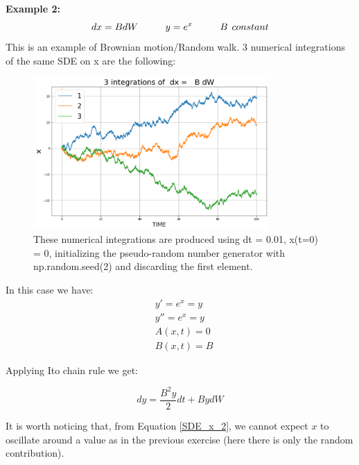\textbf{Example 2:} 
\begin{equation}
    dx = BdW \hspace{10mm} y = e^x \hspace{10mm} B\hspace{1.5mm}constant
    \label{SDE_x_2}
\end{equation}
This is an example of Brownian motion/Random walk. 
3 numerical integrations of the same SDE on x are the following:
\begin{figure}[H]
  \centering
  \includegraphics[width=0.8\textwidth]{SDE/Figures/SDEx_2.png}
  \caption{These numerical integrations are produced using dt = 0.01, x(t=0) = 0, initializing the pseudo-random number generator with np.random.seed(2) and discarding the first element.} 
  \label{Fig:SDE_x_2}
\end{figure}

In this case we have:
 \begin{equation}
     \begin{split}
         & y' = e^x = y \\
         & y'' = e^x = y \\
         & A(x, t) = 0 \\
         & B(x, t) = B
     \end{split}
 \end{equation}

Applying Ito chain rule we get: 
  
\begin{equation}
    dy = \frac{B^2y}{2}dt + BydW
    \label{SDE_y_2}
\end{equation}

It is worth noticing that, from Equation \ref{SDE_x_2}, we cannot expect $x$ to oscillate around a value as in the previous exercise (here there is only the random contribution). 

